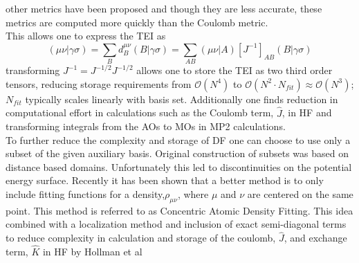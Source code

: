 		other metrics have been proposed\cite{Baerends 1973} and though they are less accurate, these metrics are computed more quickly than the Coulomb metric.\\
		This allows one to express the TEI as 
			\begin{equation}
				(\mu\nu|\gamma\sigma) = \sum_B d^{\mu\nu}_B (B|\gamma\sigma) = \sum_{AB} (\mu\nu|A)[J^{-1}]_{AB}(B|\gamma\sigma)
			\end{equation}
		transforming $J^{-1} = J^{-1/2}J^{-1/2}$ allows one to store the TEI as two third order tensors, reducing storage requirements from $\mathcal{O}(N^4)$ to $\mathcal{O}(N^2\cdot N_{fit}) \approx \mathcal{O}(N^3)$; $N_{fit}$ typically scales linearly with basis set.  Additionally one finds reduction in computational effort in calculations such as the Coulomb term, $\hat{J}$, in HF and transforming integrals from the AOs to MOs in MP2 calculations.\\
		To further reduce the complexity and storage of DF one can choose to use only a subset of the given auxiliary basis.  Original construction of subsets was based on distance based domains. Unfortunately this led to discontinuities on the potential energy surface.  Recently it has been shown that a better method is to only include fitting functions for a density,$\rho_{\mu\nu}$, where $\mu$ and $\nu$ are centered on the same point. This method is referred to as Concentric Atomic Density Fitting.  This idea combined with a localization method and inclusion of exact semi-diagonal terms to reduce complexity in calculation and storage of the coulomb, $\hat{J}$, and exchange term, $\hat{K}$ in HF by Hollman et al\cite{Hollman}
